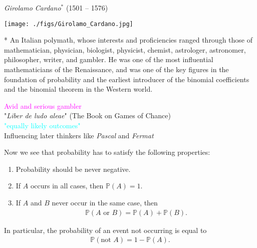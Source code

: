 \documentclass[9pt,xcolor=dvipsnames,table]{beamer}
\begin{document}
\begin{frame}[fragile] %
 \begin{center}

   \textit{Girolamo Cardano}$^*$ (1501 -- 1576) \\ \bigskip

   \begin{minipage}{ 0.4\textwidth }
     \texttt{[image: ./figs/Girolamo\_Cardano.jpg]}
   \end{minipage}
   \quad
   \begin{minipage}{ 0.35\textwidth }
    \small{* An Italian polymath, whose interests and proficiencies ranged through those of
      mathematician, physician, biologist, physicist, chemist, astrologer, astronomer, philosopher,
      writer, and gambler. He was one of the most influential mathematicians of the Renaissance, and
      was one of the key figures in the foundation of probability and the earliest introducer of the
    binomial coefficients and the binomial theorem in the Western world.}
   \end{minipage}
   \bigskip

   \textcolor{magenta}{\Huge Avid and serious gambler}\\
   "\textit{Liber de ludo aleae}" {\small(The Book on Games of Chance)} \\
   \textcolor{cyan}{\Large "equally likely outcomes"}\\
   {\footnotesize Influencing later thinkers like \textit{Pascal} and \textit{Fermat}}
 \end{center}
\end{frame}
\begin{frame}[fragile,t] %
 Now we see that probability has to satisfy the following properties: \pause

 \begin{enumerate}
   \item Probability should be never negative.
   \item If $A$ occurs in all cases, then  $ \mathbb{P}(A)=1$.
   \item If $A$ and $B$ never occur in the same case, then
     \begin{align*}
       \mathbb{P}\left(\text{$A$ or  $B$}\right) = \mathbb{P}(A) + \mathbb{P}(B).
     \end{align*}
 \end{enumerate}
 \vfill \pause

 In particular, the probability of an event not occurring is equal to
 \begin{align*}
   \mathbb{P}(\text{not $A$})  = 1 - \mathbb{P}(A).
 \end{align*}

\end{frame}
\end{document}
